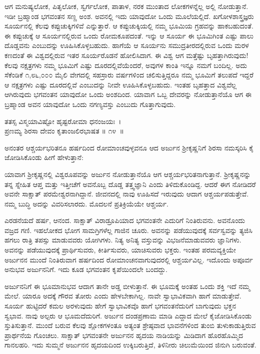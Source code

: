 ಆಗ ಮನುಷ್ಯಲೋಕ, ಪಿತೃಲೋಕ, ಸ್ವರ್ಗಲೋಕ, ಪಾತಾಳ, ನರಕ ಮುಂತಾದ ಲೋಕಗಳನ್ನೆಲ್ಲ ಅಲ್ಲಿ ನೋಡುತ್ತಾನೆ. ಇಡೀ ಬ್ರಹ್ಮಾಂಡ ಭಗವಂತನ ಸಣ್ಣ ಅಂಶ. ಅವನಲ್ಲಿ ಇದು ಯಾವುದೋ ಒಂದು ಮೂಲೆಯಲ್ಲಿದೆ. ಖಗೋಳಶಾಸ್ತ್ರಜ್ಞರು ಸೂರ್ಯನಲ್ಲಿ ಕೆಲವು ಕಪ್ಪುಚುಕ್ಕಿಗಳಿವೆ ಎನ್ನುತ್ತಾರೆ. ಆ ಕಪ್ಪುಚುಕ್ಕಿಯಲ್ಲಿ ನಮ್ಮ ಭೂಮಿಯ ಗ್ರಹವನ್ನು ಹಾಕಬಹುದಂತೆ. ಈ ಕಪ್ಪುಚುಕ್ಕೆ ಆ ಸೂರ್ಯನಲ್ಲಿರುವ ಒಂದು ರೋಮಕೂಪದಂತೆ. ಇನ್ನು ಆ ಸೂರ್ಯ ಈ ಭೂಮಿಗಿಂತ ಎಷ್ಟು ಪಾಲು ದೊಡ್ಡವನು ಎಂಬುದನ್ನು ಊಹಿಸಿಕೊಳ್ಳಬಹುದು. ಹಾಗೆಯೆ ಆ ಸೂರ್ಯನು ಸಮುದ್ರತೀರದಲ್ಲಿರುವ ಒಂದು ಮರಳ ಕಣದಂತೆ ಈ ವಿಶ್ವದಲ್ಲಿರುವ ಇತರ ಸೂರ್ಯರೊಡನೆ ಹೋಲಿಸಿದಾಗ. ಈ ವಿಶ್ವ ಆಗ ಮತ್ತೆಷ್ಟು ಬೃಹತ್ತಾಗಿರುವುದು! ಕೆಲವು ನಕ್ಷತ್ರಗಳು ನಮ್ಮ ಭೂಮಿಗೆ ಎಷ್ಟು ದೂರದಲ್ಲಿವೆಯೆಂದರೆ, ಅವುಗಳ ಕಾಂತಿ ಇನ್ನೂ ನಮಗೆ ಬಂದಿಲ್ಲ. ಅದು ಸೆಕೆಂಡಿಕೆ ೧,೮೬,೦೦೦ ಮೈಲಿ ವೇಗದಲ್ಲಿ ಸಹಸ್ರಾರು ವರ್ಷಗಳಿಂದ ಚಲಿಸುತ್ತಿದ್ದರೂ ನಮ್ಮ ಭೂಮಿಗೆ ತಲುಪದೆ ಇದ್ದರೆ ಆ ನಕ್ಷತ್ರಗಳು ಎಷ್ಟು ದೂರದಲ್ಲಿವೆ ಎಂಬುದನ್ನು ನೀವೇ ಊಹಿಸಿಕೊಳ್ಳಬಹುದು. ಇಂತಹ ಬೃಹತ್ತಾದ ವಿಶ್ವವೆಲ್ಲ ಆಗಿರುವುದು ಭಗವಂತನ ಯಾವುದೋ ಒಂದು ಅಂಶದಿಂದ. ಯಾವಾಗ ಒಬ್ಬ ದೇವರನ್ನು ನೋಡುತ್ತಾನೆಯೊ ಆಗ ಈ ಬ್ರಹ್ಮಾಂಡ ಅವನ ಯಾವುದೋ ಒಂದು ನಗಣ್ಯವಸ್ತು ಎಂಬುದು ಗೊತ್ತಾಗುವುದು.

\begin{shloka}
ತತಸ್ಸ ವಿಸ್ಮಯಾವಿಷ್ಟೋ ಹೃಷ್ಟರೋಮಾ ಧನಂಜಯಃ~।\\ಪ್ರಣಮ್ಯ ಶಿರಸಾ ದೇವಂ ಕೃತಾಂಜಲಿರಭಾಷತ \hfill॥ ೧೪~॥
\end{shloka}

\begin{artha}
ಅನಂತರ ಆಶ್ಚರ್ಯಭರಿತನೂ ಹರ್ಷದಿಂದ ರೋಮಾಂಚವುಳ್ಳವನೂ ಆದ ಅರ್ಜುನ ಶ‍್ರೀಕೃಷ್ಣನಿಗೆ ಶಿರಸಾ ನಮಸ್ಕರಿಸಿ ಕೈ ಜೋಡಿಸಿಕೊಂಡು ಹೀಗೆ ಹೇಳುತ್ತಾನೆ:
\end{artha}

ಯಾವಾಗ ಶ‍್ರೀಕೃಷ್ಣನಲ್ಲಿ ವಿಶ್ವರೂಪವನ್ನು ಅರ್ಜುನ ನೋಡುತ್ತಾನೆಯೊ ಆಗ ಆಶ್ಚರ್ಯಭರಿತ\-ನಾಗುತ್ತಾನೆ. ಶ‍್ರೀಕೃಷ್ಣನನ್ನು ತನ್ನ ಸ್ನೇಹಿತ ಆಪ್ತ ಮತ್ತು ಇತ್ತೀಚೆಗೆ ಅವನೊಬ್ಬ ದೊಡ್ಡ ತತ್ತ್ವಜ್ಞಾನಿ ಎಂದು ತಿಳಿದುಕೊಂಡಿದ್ದ. ಆದರೆ ಈಗ ನೋಡಿದರೆ ಅವನೇ ಸಾಕ್ಷಾತ್ ಪರಮೇಶ್ವರನಾಗಿದ್ದಾನೆ. ಜೀವನದಲ್ಲಿ ನಾವು ಊಹಿಸದೆ ಇರುವುದು ಆದಾಗ ಆಶ್ಚರ್ಯಪಡುತ್ತೇವೆ. ನಮ್ಮ ಬುದ್ಧಿ ಅದನ್ನು ವಿವರಿಸಲಾರದು. ಮೊದಲನೆ ಪ್ರತಿಕ್ರಿಯೆಯೇ ಆಶ್ಚರ್ಯ.

ಎರಡನೆಯದೆ ಹರ್ಷ, ಆನಂದ. ಸಾಕ್ಷಾತ್ ವಿರಾಡ್ರೂಪಿಯಾದ ಭಗವಂತನೇ ಎದುರಿಗೆ ನಿಂತಿರುವನು. ಅವನೊಂದು ವಜ್ರದ ಗಣಿ. ಇಹಲೋಕದ ಭೋಗ ಸಾಮಗ್ರಿಗಳೆಲ್ಲ ಗಾಜಿನ ಚೂರು. ಅವನನ್ನು ಪಡೆಯುವುದಕ್ಕೆ ಸರ್ವಸ್ವವನ್ನು ತ್ಯಜಿಸಿ ಹಗಲು ರಾತ್ರಿ ತಪಸ್ಸು ಮಾಡುವವರು ಯೋಗಿಗಳು. ನಿತ್ಯ ಅನಿತ್ಯ ವಸ್ತುವನ್ನು ವಿಭಜನೆಮಾಡುವವರು ಜ್ಞಾನಿಗಳು. ಅವನನ್ನು ಪಡೆಯುವುದಕ್ಕೆ ಪ್ರಾರ್ಥಿಸುವರು, ಕೀರ್ತಿಸುವರು, ಯಾಚಿಸುವರು ಭಕ್ತರು. ಇಂತಹ ಪರಮವ್ಯಕ್ತಿಯೇ ಅರ್ಜುನನ ಮುಂದೆ ನಿಂತಿರುವಾಗ ಹರ್ಷದಿಂದ ರೋಮಾಂಚನವಾಗುವುದರಲ್ಲಿ ಆಶ್ಚರ್ಯವಿಲ್ಲ. ಇದೊಂದು ಅಪೂರ್ವ ಅನುಭವ ಅರ್ಜುನನಿಗೆ. ಇದು ಕೂಡ ಭಗವಂತನ ಕೃಪೆಯಿಂದಲೇ ಬಂದದ್ದು.

ಅರ್ಜುನನಿಗೆ ಈ ಭೂಮಾನುಭವ ಆದಾಗ ತಾನೇ ಅಡ್ಡ ಬೀಳುತ್ತಾನೆ. ಈ ಭೂಮಕ್ಕೆ ಅಂತಹ ಒಂದು ಶಕ್ತಿ ಇದೆ ನಮ್ಮ ಮೇಲೆ. ಯಾರೂ ಅದಕ್ಕೆ ಗೌರವ ತೋರು ಎಂದು ಹೇಳಬೇಕಾಗಿಲ್ಲ. ನಾವೇ ಸ್ವಾಭಾವಿಕವಾಗಿ ಹಾಗೆ ಮಾಡುತ್ತೇವೆ. ಸೂರ್ಯ ಹುಟ್ಟಿದರೆ ಕಮಲ ಅರಳುವುದು ಹೇಗೆ ಸ್ವಾಭಾವಿಕವೊ ಹಾಗೆ ಭಗವಂತನೆದುರಿಗೆ ಬಾಗುವುದು ಭಕ್ತನ ಸ್ವಭಾವ. ನಾವು ಅಲ್ಪರು ಆ ಭೂಮದೆದುರಿಗೆ. ಅರ್ಜುನ ದಂಡಪ್ರಣಾಮ ಮಾಡಿ ಎದ್ದಾದ ಮೇಲೆ ಕೈಜೋಡಿಸಿಕೊಂಡು ಸ್ತುತಿಸುತ್ತಾನೆ. ಮುಂದೆ ಬರುವ ಕೆಲವು ಶ್ಲೋಕಗಳಂತೂ ಅತ್ಯಂತ ಶ್ರೇಷ್ಠವಾದ ಭಾವನೆಗಳಿಂದ ತುಂಬಿ ತುಳುಕಾಡುತ್ತಿರುವ ಪ್ರಾರ್ಥನೆಯ ಗೊಂಚಲು. ಸಾಕ್ಷಾತ್ ಭಗವಂತನೇ ಅರ್ಜುನನ ಹೃದಯ ನಾಡಿಯನ್ನು ಮಿಡಿದಾಗ ಹೊರಹೊಮ್ಮಿದ ಗಾನಲಹರಿ. ಇದು ಸುಮ್ಮನೆ ಅರ್ಜುನನ ಹೃದಯದಿಂದ ಉಕ್ಕಿಬರುತ್ತಿದೆ, ತಿಳಿನೀರು ಚಿಲುಮೆಯಿಂದ ಜಿನುಗಿ ಬರುವಂತೆ.

